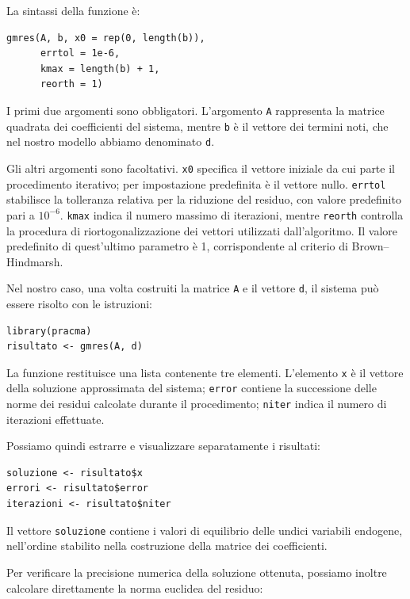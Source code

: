 La sintassi della funzione è:

\begin{verbatim}
gmres(A, b, x0 = rep(0, length(b)),
      errtol = 1e-6,
      kmax = length(b) + 1,
      reorth = 1)
\end{verbatim}

I primi due argomenti sono obbligatori.
L'argomento \texttt{A} rappresenta la matrice
quadrata dei coefficienti del sistema, mentre
\texttt{b} è il vettore dei termini noti, che nel
nostro modello abbiamo denominato \texttt{d}.

Gli altri argomenti sono facoltativi.
\texttt{x0} specifica il vettore iniziale da cui
parte il procedimento iterativo; per impostazione
predefinita è il vettore nullo.
\texttt{errtol} stabilisce la tolleranza relativa
per la riduzione del residuo, con valore
predefinito pari a $10^{-6}$.
\texttt{kmax} indica il numero massimo di
iterazioni, mentre \texttt{reorth} controlla
la procedura di riortogonalizzazione dei
vettori utilizzati dall'algoritmo.
Il valore predefinito di quest'ultimo parametro
è 1, corrispondente al criterio di
Brown--Hindmarsh.

Nel nostro caso, una volta costruiti la matrice
\texttt{A} e il vettore \texttt{d}, il sistema
può essere risolto con le istruzioni:

\begin{verbatim}
library(pracma)
risultato <- gmres(A, d)
\end{verbatim}

La funzione restituisce una lista contenente
tre elementi. L'elemento \texttt{x} è il vettore
della soluzione approssimata del sistema;
\texttt{error} contiene la successione delle
norme dei residui calcolate durante il procedimento;
\texttt{niter} indica il numero di iterazioni
effettuate.

Possiamo quindi estrarre e visualizzare
separatamente i risultati:

\begin{verbatim}
soluzione <- risultato$x
errori <- risultato$error
iterazioni <- risultato$niter
\end{verbatim}

Il vettore \texttt{soluzione} contiene i valori
di equilibrio delle undici variabili endogene,
nell'ordine stabilito nella costruzione della
matrice dei coefficienti.

Per verificare la precisione numerica della
soluzione ottenuta, possiamo inoltre calcolare
direttamente la norma euclidea del residuo:

